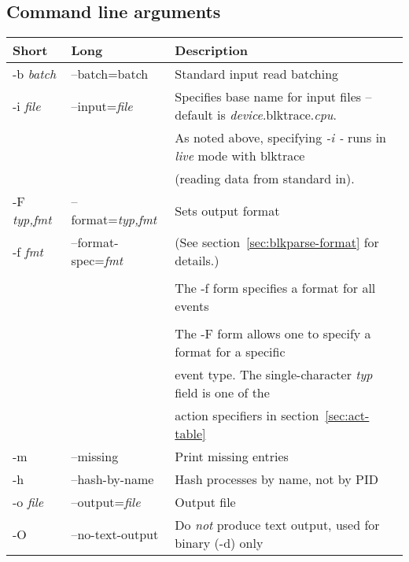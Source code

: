 \documentclass{article}
\begin{document}
\newpage\subsection{\label{sec:blkparse-args}Command line arguments}
\begin{tabular}{|l|l|l|}\hline
Short              & Long                       & Description \\ \hline\hline
-b \emph{batch}    & --batch={batch}            & Standard input read batching \\ \hline

-i \emph{file}     & --input=\emph{file}        & Specifies base name for input files -- default is \emph{device}.blktrace.\emph{cpu}. \\
                   &                            & As noted above, specifying \emph{-i -} runs in \emph{live} mode with blktrace \\
		   &                            & (reading data from standard in). \\ \hline

-F \emph{typ,fmt}  & --format=\emph{typ,fmt}    & Sets output format \\
-f \emph{fmt}      & --format-spec=\emph{fmt}   & (See section~\ref{sec:blkparse-format} for details.) \\ 
                   &                            & \\
		   &                            & The -f form specifies a format for all events \\
                   &                            & \\
		   &                            & The -F form allows one to specify a format for a specific \\
		   &                            & event type. The single-character \emph{typ} field is one of the \\
		   &                            & action specifiers in section~\ref{sec:act-table} \\ \hline


-m                 & --missing                  & Print missing entries\\ \hline

-h                 & --hash-by-name             & Hash processes by name, not by PID\\ \hline

-o \emph{file}     & --output=\emph{file}       & Output file \\ \hline
-O                 & --no-text-output           & Do \emph{not} produce text output, used for binary (-d) only \\ \hline


\end{tabular}
\end{document}
